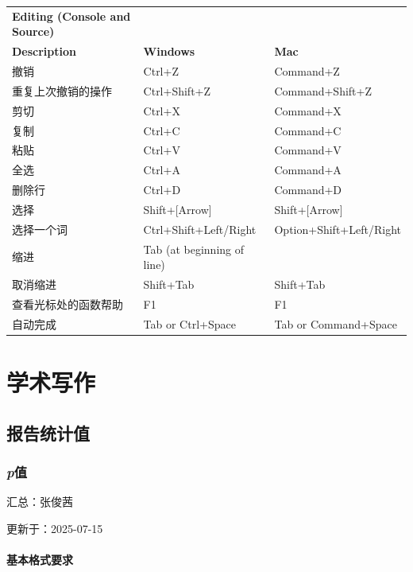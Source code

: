 \documentclass[]{ctexbook}
\theoremstyle{definition}
\theoremstyle{definition}
\theoremstyle{definition}
\theoremstyle{definition}
\theoremstyle{remark}
\begin{document}
\begin{longtable}[]{@{}lll@{}}
\textbf{Editing (Console and Source)} & & \\
\textbf{Description} & \textbf{Windows} & \textbf{Mac} \\
撤销 & Ctrl+Z & Command+Z \\
重复上次撤销的操作 & Ctrl+Shift+Z & Command+Shift+Z \\
剪切 & Ctrl+X & Command+X \\
复制 & Ctrl+C & Command+C \\
粘贴 & Ctrl+V & Command+V \\
全选 & Ctrl+A & Command+A \\
删除行 & Ctrl+D & Command+D \\
选择 & Shift+{[}Arrow{]} & Shift+{[}Arrow{]} \\
选择一个词 & Ctrl+Shift+Left/Right & Option+Shift+Left/Right \\
缩进 & Tab (at beginning of line) & \\
取消缩进 & Shift+Tab & Shift+Tab \\
查看光标处的函数帮助 & F1 & F1 \\
自动完成 & Tab or Ctrl+Space & Tab or Command+Space \\
\end{longtable}

\part{学术写作}\label{part-ux5b66ux672fux5199ux4f5c}

\chapter{报告统计值}\label{reportstats}

\section{\texorpdfstring{\emph{p}值}{p值}}\label{pvalue}

汇总：张俊茜

更新于：2025-07-15

\subsection{基本格式要求}\label{ux57faux672cux683cux5f0fux8981ux6c42}
\end{document}
